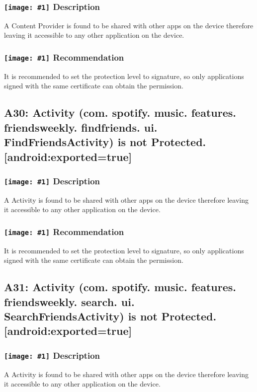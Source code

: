 \documentclass[12p]{article}
\newcommand{\icon}[1]{\texttt{[image: \#1]}}
\begin{document}
\subsubsection*{\protect\icon{/home/miki/Documents/GITHUB/AndroidPermissions/python/vulns/report_icons/basic_sheet.png} Description}
A Content Provider is found to be shared with other apps on the device therefore leaving it accessible to any other application on the device.
\subsubsection*{\protect\icon{/home/miki/Documents/GITHUB/AndroidPermissions/python/vulns/report_icons/basic_todo.png} Recommendation}
It is recommended to set the protection level to signature, so only applications signed with the same certificate can obtain the permission.
\subsection{A30: Activity (com. spotify. music. features. friendsweekly. findfriends. ui. FindFriendsActivity) is not Protected. [android:exported=true]}
\subsubsection*{\protect\icon{/home/miki/Documents/GITHUB/AndroidPermissions/python/vulns/report_icons/basic_sheet.png} Description}
A Activity is found to be shared with other apps on the device therefore leaving it accessible to any other application on the device.
\subsubsection*{\protect\icon{/home/miki/Documents/GITHUB/AndroidPermissions/python/vulns/report_icons/basic_todo.png} Recommendation}
It is recommended to set the protection level to signature, so only applications signed with the same certificate can obtain the permission.
\subsection{A31: Activity (com. spotify. music. features. friendsweekly. search. ui. SearchFriendsActivity) is not Protected. [android:exported=true]}
\subsubsection*{\protect\icon{/home/miki/Documents/GITHUB/AndroidPermissions/python/vulns/report_icons/basic_sheet.png} Description}
A Activity is found to be shared with other apps on the device therefore leaving it accessible to any other application on the device.
\end{document}
